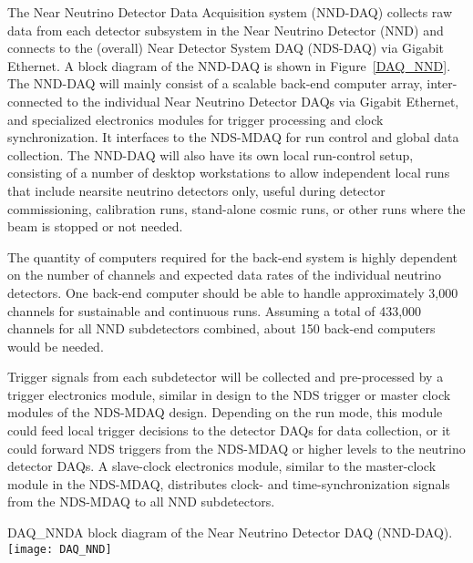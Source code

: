 
The Near Neutrino Detector Data Acquisition system (NND-DAQ) collects raw data from 
each %
detector subsystem in the Near Neutrino Detector (NND) and connects to the (overall) Near 
Detector System DAQ (NDS-DAQ) via Gigabit Ethernet. A block diagram of the NND-DAQ is
shown in Figure~\ref{DAQ_NND}. The NND-DAQ will mainly consist 
of a scalable back-end computer array, inter-connected to the individual Near Neutrino 
Detector DAQs via Gigabit Ethernet, and specialized electronics modules for trigger 
processing and clock synchronization. It interfaces to the NDS-MDAQ for 
run control and global data collection. The NND-DAQ will also have its own local run-control setup, 
consisting of a number of desktop workstations to allow independent local runs that include 
nearsite neutrino detectors only, useful during detector commissioning, calibration runs, 
stand-alone cosmic runs, or other runs where the beam is stopped or not needed.

The quantity of computers required for the back-end system is highly dependent on the 
number of channels and expected data rates of the individual neutrino detectors. 
One back-end computer should be able to handle 
approximately 3,000 channels for sustainable and continuous runs. Assuming a total of 
433,000 channels for all NND subdetectors combined, about 150 back-end computers would be 
needed.

Trigger signals from each subdetector will be collected and pre-processed by a 
trigger electronics module, similar in design to the NDS  trigger or master clock modules 
of the NDS-MDAQ design. Depending on the run mode, this module could feed local 
trigger 
decisions to the detector DAQs for data collection, or it could forward NDS triggers 
from the NDS-MDAQ or higher levels to the neutrino detector DAQs.  A slave-clock electronics 
module, similar to the master-clock module in the NDS-MDAQ, distributes clock- and 
time-synchronization signals from the NDS-MDAQ to all NND subdetectors.


\begin{cdrfigure}{DAQ_NND}{A block diagram of the Near Neutrino Detector DAQ (NND-DAQ).}
\texttt{[image: DAQ\_NND]}
\end{cdrfigure}


